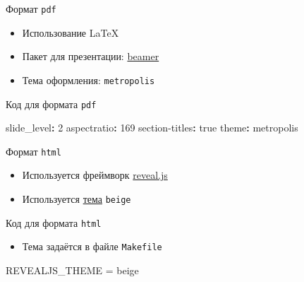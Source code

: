 \documentclass[
  ignorenonframetext,
  aspectratio=169,
]{beamer}
\newenvironment{Shaded}{\begin{snugshade}}{\end{snugshade}}
\newcommand{\AttributeTok}[1]{\textcolor[rgb]{0.40,0.45,0.13}{#1}}
\newcommand{\CharTok}[1]{\textcolor[rgb]{0.13,0.47,0.30}{#1}}
\newcommand{\DecValTok}[1]{\textcolor[rgb]{0.68,0.00,0.00}{#1}}
\newcommand{\FunctionTok}[1]{\textcolor[rgb]{0.28,0.35,0.67}{#1}}
\newcommand{\KeywordTok}[1]{\textcolor[rgb]{0.00,0.23,0.31}{\textbf{#1}}}
\newcommand{\NormalTok}[1]{\textcolor[rgb]{0.00,0.23,0.31}{#1}}
\providecommand{\tightlist}{%
  \setlength{\itemsep}{0pt}\setlength{\parskip}{0pt}}\usepackage{longtable,booktabs,array}
\begin{document}
\begin{frame}[fragile]{Формат \texttt{pdf}}
\label{ux444ux43eux440ux43cux430ux442-pdf}
\begin{itemize}[<+->]
\tightlist
\item
  Использование LaTeX
\item
  Пакет для презентации: \href{https://ctan.org/pkg/beamer}{beamer}
\item
  Тема оформления: \texttt{metropolis}
\end{itemize}
\end{frame}

\begin{frame}[fragile]{Код для формата \texttt{pdf}}
\label{ux43aux43eux434-ux434ux43bux44f-ux444ux43eux440ux43cux430ux442ux430-pdf}
\begin{Shaded}
\begin{Highlighting}[]
\FunctionTok{slide\_level}\KeywordTok{:}\AttributeTok{ }\DecValTok{2}
\FunctionTok{aspectratio}\KeywordTok{:}\AttributeTok{ }\DecValTok{169}
\FunctionTok{section{-}titles}\KeywordTok{:}\AttributeTok{ }\CharTok{true}
\FunctionTok{theme}\KeywordTok{:}\AttributeTok{ metropolis}
\end{Highlighting}
\end{Shaded}
\end{frame}

\begin{frame}[fragile]{Формат \texttt{html}}
\label{ux444ux43eux440ux43cux430ux442-html}
\begin{itemize}[<+->]
\tightlist
\item
  Используется фреймворк \href{https://revealjs.com/}{reveal.js}
\item
  Используется \href{https://revealjs.com/themes/}{тема} \texttt{beige}
\end{itemize}
\end{frame}

\begin{frame}[fragile]{Код для формата \texttt{html}}
\label{ux43aux43eux434-ux434ux43bux44f-ux444ux43eux440ux43cux430ux442ux430-html}
\begin{itemize}[<+->]
\tightlist
\item
  Тема задаётся в файле \texttt{Makefile}
\end{itemize}

\begin{Shaded}
\begin{Highlighting}[]
\NormalTok{REVEALJS\_THEME = beige}
\end{Highlighting}
\end{Shaded}
\end{frame}
\end{document}
